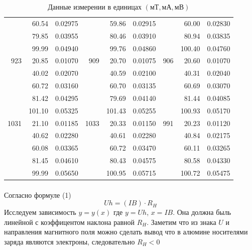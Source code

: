 \documentclass{article}
\begin{document}
\begin{table}[h]
\begin{center}
\begin{tabular}{rrr rrr rrr}
     &  60.54 &  0.02975 &      &   59.86 &  0.02915 &      &   60.00 &  0.02830 \\
     &  79.85 &  0.03955 &      &   80.46 &  0.03910 &      &   80.94 &  0.03835 \\
     &  99.99 &  0.04940 &      &   99.76 &  0.04860 &      &  100.40 &  0.04760 \\\midrule
923  &  20.85 &  0.01070 & 909  &   20.70 &  0.01075 & 906  &   20.60 &  0.01070 \\
     &  40.02 &  0.02070 &      &   40.59 &  0.02100 &      &   40.31 &  0.02040 \\
     &  60.72 &  0.03160 &      &   60.70 &  0.03135 &      &   60.69 &  0.03070 \\
     &  81.42 &  0.04295 &      &   79.69 &  0.04140 &      &   81.44 &  0.04085 \\
     & 101.10 &  0.05325 &      &  101.43 &  0.05255 &      &  100.93 &  0.05170 \\\midrule
1031 &  21.10 &  0.01185 & 1033 &   20.33 &  0.01150 & 991  &   20.23 &  0.01120 \\
     &  40.62 &  0.02280 &      &   40.61 &  0.02280 &      &   40.84 &  0.02175 \\
     &  60.08 &  0.03365 &      &   60.72 &  0.03470 &      &   60.11 &  0.03265 \\
     &  81.45 &  0.04610 &      &   80.43 &  0.04575 &      &   80.58 &  0.04330 \\
     &  99.99 &  0.05650 &      &  100.95 &  0.05715 &      &  100.72 &  0.05475 \\\bottomrule
\end{tabular}
\caption{Данные измерении в единицах $(мТ, мА, мВ)$}
\end{center}
\end{table}
\newpage

\paragraph{}
Согласно формуле (1)
\begin{equation}
    Uh = (IB) \cdot R_H
\end{equation}
Исследуем зависимость $y=y(x)$ где $y=Uh$, $x=IB$. Она должна быль линейной с 
коэффицентом наклона равной $R_H$. Заметим что из знака $U$ и направления 
магнитного поля можно сделать вывод что в алюмине носителями заряда являются электроны,
следовательно $R_H < 0$
\end{document}
